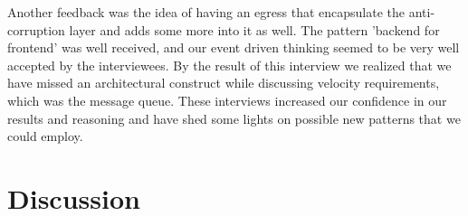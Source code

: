 \documentclass[a4paper,11pt,article,oneside]{memoir}
\begin{document}
Another feedback was the idea of having an egress that encapsulate the anti-corruption layer and adds some more into it as well. The pattern 'backend for frontend' was well received, and our event driven thinking seemed to be very well accepted by the interviewees. By the result of this interview we realized that we have missed an architectural construct while discussing velocity requirements, which was the message queue. These interviews increased our confidence in our results and reasoning and have shed some lights on possible new patterns that we could employ.





\chapter{Discussion}


\end{document}
